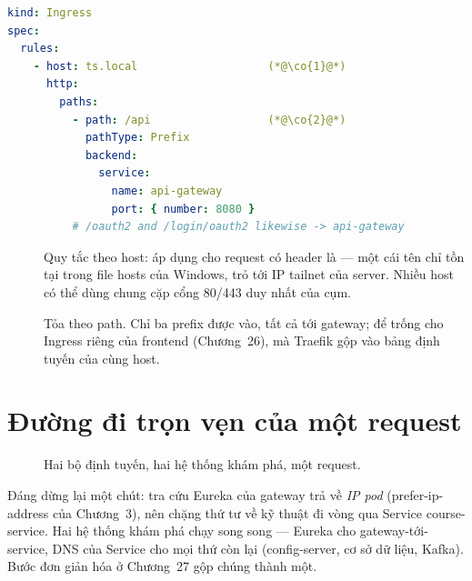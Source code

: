 \begin{lstlisting}[language=yaml]
kind: Ingress
spec:
  rules:
    - host: ts.local                    (*@\co{1}@*)
      http:
        paths:
          - path: /api                  (*@\co{2}@*)
            pathType: Prefix
            backend:
              service:
                name: api-gateway
                port: { number: 8080 }
          # /oauth2 and /login/oauth2 likewise -> api-gateway
\end{lstlisting}

\begin{description}
  \item[] Quy tắc theo host: áp dụng cho request có header
   là  --- một cái tên chỉ tồn tại trong file
  hosts của Windows, trỏ tới IP tailnet của server. Nhiều host có thể
  dùng chung cặp cổng 80/443 duy nhất của cụm.
  \item[] Tỏa theo path. Chỉ ba prefix được vào, tất cả tới
  gateway; \code{/} để trống cho Ingress riêng của frontend
  (Chương~26), mà Traefik gộp vào bảng định tuyến của cùng host.
\end{description}

\section{Đường đi trọn vẹn của một request}

\begin{figure}[h]
\centering
{}
\caption{Hai bộ định tuyến, hai hệ thống khám phá, một request.}
\end{figure}

Đáng dừng lại một chút: tra cứu Eureka của gateway trả về \emph{IP pod}
(prefer-ip-address của Chương~3), nên chặng thứ tư về kỹ thuật đi vòng
qua Service course-service. Hai hệ thống khám phá chạy song song ---
Eureka cho gateway-tới-service, DNS của Service cho mọi thứ còn lại
(config-server, cơ sở dữ liệu, Kafka). Bước đơn giản hóa ở Chương~27
gộp chúng thành một.

